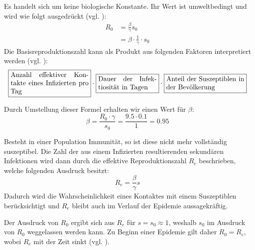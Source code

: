 \documentclass[../main.tex]{subfiles}
\begin{document}
        Es handelt sich um keine biologische Konstante. Ihr Wert ist umweltbedingt und wird wie folgt ausgedrückt (vgl. \cite[S. 1]{Jon07}):
        \begin{equation}
            \label{eq:basic_reproductive_number}
            \begin{split}
                R_0 &= \frac{\beta}{\gamma} s_0 \\
                    &= \beta \cdot \frac{1}{\gamma} \cdot s_0
            \end{split}
        \end{equation}
        Die Basisreproduktionszahl kann als Produkt aus folgenden Faktoren interpretiert werden (vgl. \cite[S. 32]{Li18}):
        \begin{equation*}
            \fbox{\parbox{4cm}{Anzahl effektiver Kontakte eines Infizierten pro Tag}}
            \cdot
            \fbox{\parbox{3cm}{Dauer der Infektiosität in Tagen}}
            \cdot
            \fbox{\parbox{4cm}{Anteil der Suszeptiblen in der Bevölkerung}}
        \end{equation*}

        Durch Umstellung dieser Formel erhalten wir einen Wert für $\beta$:
        \begin{equation*}
            \beta   = \frac{R_0 \cdot \gamma}{s_0}
                    = \frac{9.5 \cdot 0.1}{1}
                    =0.95
        \end{equation*}

        Besteht in einer Population Immunität, so ist diese nicht mehr vollständig suszeptibel. Die Zahl der aus einem Infizierten resultierenden sekundären Infektionen wird dann durch die effektive Reproduktionszahl $R_e$ beschrieben, welche folgenden Ausdruck besitzt:
        \begin{equation}
            \label{eq:effective_reproductive_number}
                R_e = \frac{\beta}{\gamma} s
        \end{equation}
        Dadurch wird die Wahrscheinlichkeit eines Kontaktes mit einem Suszeptiblen berücksichtigt und $R_e$ bleibt auch im Verlauf der Epidemie aussagekräftig.

        Der Ausdruck von $R_0$ ergibt sich aus $R_e$ für $s = s_0 \approx 1$, weshalb $s_0$ im Ausdruck von $R_0$ weggelassen werden kann. Zu Beginn einer Epidemie gilt daher $R_0 = R_e$, wobei $R_e$ mit der Zeit sinkt (vgl. \cite[S. 604]{Het00}).
\end{document}
